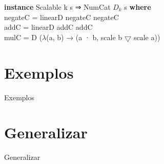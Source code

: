 \documentclass{beamer}
\begin{document}
\begin{frame}
    \textbf{instance} Scalable k s ⇒ NumCat $D_k$ s \textbf{where}\\
        \hspace{1cm}negateC = linearD negateC negateC\\
        \hspace{1cm}addC = linearD addC addC\\
        \hspace{1cm}mulC = D ($\lambda$(a, b) → (a · b, scale b $\bigtriangledown$ scale a))\\
\end{frame}

\section{Exemplos}
\begin{frame}{Exemplos}
\end{frame}

\section{Generalizar}
\begin{frame}{Generalizar}
\end{frame}
\end{document}
